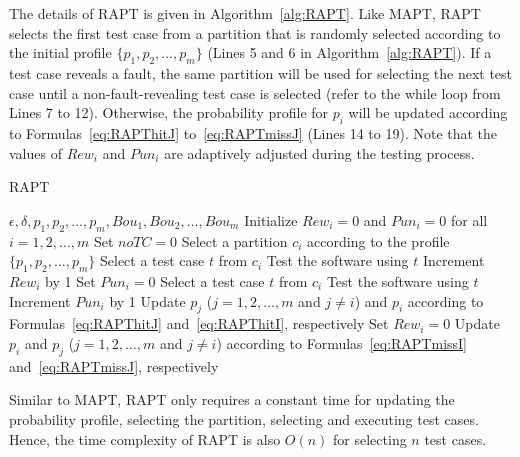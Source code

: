 \documentclass[10pt,journal,compsoc]{IEEEtran}
\begin{document}
The details of RAPT is given in Algorithm~\ref{alg:RAPT}. Like MAPT, RAPT selects the first test case from a partition that is randomly selected according to the initial profile $\{p_1, p_2, \ldots, p_m\}$ (Lines 5 and 6 in Algorithm~\ref{alg:RAPT}). If a test case reveals a fault, the same partition will be used for selecting the next test case until a non-fault-revealing test case is selected (refer to the while loop from Lines 7 to 12). Otherwise, the probability profile for $p_i$ will be updated according to Formulas~\ref{eq:RAPThitJ} to~\ref{eq:RAPTmissJ} (Lines 14 to 19). Note that the values of $Rew_i$ and $Pun_i$ are adaptively adjusted during the testing process.

\begin{algorithm}
	\caption{RAPT}
	\label{alg:RAPT}
	\begin{algorithmic}[1]
		\renewcommand{\algorithmicrequire}{\textbf{Input:}}
		\renewcommand{\algorithmicensure}{\textbf{Output:}}
		\renewcommand{\algorithmicendwhile}{\algorithmicend\_\algorithmicwhile}
		\renewcommand{\algorithmicendfor}{\algorithmicend\_\algorithmicfor}
		\renewcommand{\algorithmicendif}{\algorithmicend\_\algorithmicif}
		\renewcommand{\algorithmicthen}{}
		\renewcommand{\algorithmicdo}{}
		\REQUIRE $\epsilon, \delta, p_1, p_2, \ldots, p_m, Bou_1, Bou_2, \ldots, Bou_m$
		\STATE Initialize $Rew_i = 0$ and $Pun_i = 0$ for all $i = 1, 2, \ldots, m$
		\STATE Set $noTC = 0$
		\STATE Select a partition $c_i$ according to the profile $\{p_1, p_2, \ldots, p_m\}$
		\STATE Select a test case $t$ from $c_i$
		\STATE Test the software using $t$
		\STATE Increment $Rew_i$ by 1
		\STATE Set $Pun_i = 0$
		\STATE Select a test case $t$ from $c_i$
		\STATE Test the software using $t$
		\ENDWHILE
		\STATE Increment $Pun_i$ by 1
		\STATE Update $p_j$ ($j = 1, 2, \ldots, m$ and $j \neq i$) and $p_i$ according to Formulas~\ref{eq:RAPThitJ} and~\ref{eq:RAPThitI}, respectively
		\STATE Set $Rew_i = 0$
		\ELSE
		\STATE Update $p_i$ and $p_j$ ($j = 1, 2, \ldots, m$ and $j \neq i$) according to Formulas~\ref{eq:RAPTmissI} and~\ref{eq:RAPTmissJ}, respectively
		\ENDIF
		\ENDWHILE
	\end{algorithmic}
\end{algorithm}

Similar to MAPT, RAPT only requires a constant time for updating the probability profile, selecting the partition, selecting and executing test cases. Hence, the time complexity of RAPT is also $O(n)$ for selecting $n$ test cases.
\end{document}
